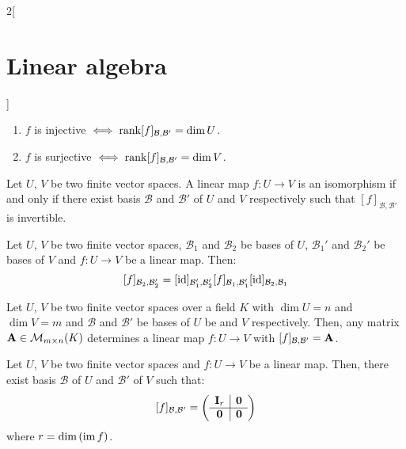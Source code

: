 \documentclass[../../../main_math.tex]{subfiles}
\begin{document}
\begin{multicols}{2}[\section{Linear algebra}]
\begin{corollary}
\begin{enumerate}
      \item $f$ is injective $\iff\rank[f]_{\mathcal{B},\mathcal{B}'}=\dim U$.
      \item $f$ is surjective $\iff\rank[f]_{\mathcal{B},\mathcal{B}'}=\dim V$.
    \end{enumerate}
  \end{corollary}
  \begin{corollary}
    Let $U$, $V$ be two finite vector spaces. A linear map $f:U\rightarrow V$ is an isomorphism if and only if there exist basis $\mathcal{B}$ and $\mathcal{B}'$ of $U$ and $V$ respectively such that $[f]_{\mathcal{B},\mathcal{B}'}$ is invertible.
  \end{corollary}
  \begin{proposition}
    Let $U$, $V$ be two finite vector spaces, $\mathcal{B}_1$ and $\mathcal{B}_2$ be bases of $U$, $\mathcal{B}_1'$ and $\mathcal{B}_2'$ be bases of $V$ and $f:U\rightarrow V$ be a linear map. Then: $$[f]_{\mathcal{B}_2,\mathcal{B}_2'}=[\mathrm{id}]_{\mathcal{B}_1',\mathcal{B}_2'}[f]_{\mathcal{B}_1,\mathcal{B}_1'}[\mathrm{id}]_{\mathcal{B}_2,\mathcal{B}_1}$$
  \end{proposition}
  \begin{lemma}
    Let $U$, $V$ be two finite vector spaces over a field $K$ with $\dim U=n$ and $\dim V=m$ and $\mathcal{B}$ and $\mathcal{B}'$ be bases of $U$ be and $V$ respectively. Then, any matrix $\boldsymbol{\mathrm{A}}\in\mathcal{M}_{m\times n}(K)$ determines a linear map $f:U\rightarrow V$ with $[f]_{\mathcal{B},\mathcal{B}'}=\boldsymbol{\mathrm{A}}$.
  \end{lemma}
  \begin{theorem}
    Let $U$, $V$ be two finite vector spaces and $f:U\rightarrow V$ be a linear map. Then, there exist basis $\mathcal{B}$ of $U$ and $\mathcal{B}'$ of $V$ such that:
    $$[f]_{\mathcal{B},\mathcal{B}'}=\left(
      \begin{array}{c|c}
          \boldsymbol{\mathrm{I}}_r & \boldsymbol{\mathrm{0}} \\
          \hline
          \boldsymbol{\mathrm{0}}   & \boldsymbol{\mathrm{0}}
        \end{array}\right)$$
    where $r=\dim\left(\operatorname{im} f\right)$.
  \end{theorem}

\end{multicols}
\end{document}
